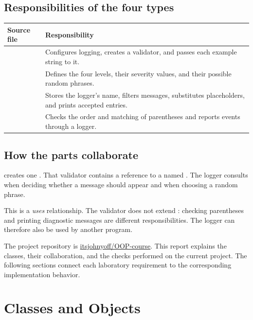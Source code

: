 \subsection{Responsibilities of the four types}
\begin{tabularx}{\textwidth}{@{}p{56mm}Y@{}}
\toprule
\textbf{Source file} & \textbf{Responsibility}\\
\midrule
{} & Configures logging, creates a validator, and passes each example string to it.\\
 & Defines the four levels, their severity values, and their possible random phrases.\\
 & Stores the logger's name, filters messages, substitutes placeholders, and prints accepted entries.\\
 & Checks the order and matching of parentheses and reports events through a logger.\\
\bottomrule
\end{tabularx}

\subsection{How the parts collaborate}
 creates one . That validator contains a reference to a  named . The logger consults  when deciding whether a message should appear and when choosing a random phrase.

\begin{center}
\end{center}

This is a \emph{uses} relationship. The validator does not extend : checking parentheses and printing diagnostic messages are different responsibilities. The logger can therefore also be used by another program.

The project repository is \href{https://github.com/itsjohnyoff/OOP-course}{itsjohnyoff/OOP-course}. This report explains the classes, their collaboration, and the checks performed on the current project. The following sections connect each laboratory requirement to the corresponding implementation behavior.

\newpage
\section{Classes and Objects}
